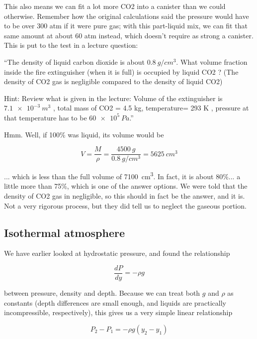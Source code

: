 \documentclass[8.01x]{subfiles}
\begin{document}
This also means we can fit a lot more CO2 into a canister than we could otherwise. Remember how the original calculations said the pressure would have to be over 300 atm if it were pure gas; with this part-liquid mix, we can fit that same amount at about 60 atm instead, which doesn't require as strong a canister. This is put to the test in a lecture question:

``The density of liquid carbon dioxide is about $\SI{0.8}{g/cm^3}$. What volume fraction inside the fire extinguisher (when it is full) is occupied by liquid CO2 ? (The density of CO2 gas is negligible compared to the density of liquid CO2)

Hint: Review what is given in the lecture: Volume of the extinguisher is $\SI{7.1e-3}{m^3}$ , total mass of CO2 = 4.5 kg, temperature= 293 K , pressure at that temperature has to be $\SI{60e5}{Pa}$.''

Hmm. Well, if 100\% was liquid, its volume would be

\begin{equation}
V = \frac{M}{\rho} = \frac{\SI{4500}{g}}{\SI{0.8}{g/cm^3}} = \SI{5625}{cm^3}
\end{equation}

... which is less than the full volume of \SI{7100}{cm^3}. In fact, it is about 80\%... a little more than 75\%, which is one of the answer options. We were told that the density of CO2 gas in negligible, so this should in fact be the answer, and it is. Not a very rigorous process, but they did tell us to neglect the gaseous portion.

\subsection{Isothermal atmosphere}

We have earlier looked at hydrostatic pressure, and found the relationship

\begin{equation}
\frac{dP}{dy} = - \rho g
\end{equation}

between pressure, density and depth. Because we can treat both $g$ and $\rho$ as constants (depth differences are small enough, and liquids are practically incompressible, respectively), this gives us a very simple linear relationship

\begin{equation}
P_2 - P_1 = -\rho g (y_2 - y_1)
\end{equation}
\end{document}
